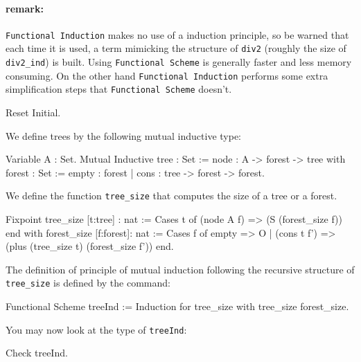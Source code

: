 \begin{coq_example*}
\paragraph{remark:} \texttt{Functional Induction} makes no use of
a induction principle, so be warned that each time it is used, a
term mimicking the structure of \texttt{div2} (roughly the size
of {\tt div2\_ind}) is built. Using \texttt{Functional Scheme} is
generally faster and less memory consuming.  On the other hand
\texttt{Functional Induction} performs some extra simplification
steps that \texttt{Functional Scheme} doesn't.




\begin{coq_eval}
Reset Initial.
\end{coq_eval}

We define trees by the following mutual inductive type:

\begin{coq_example*}
Variable A : Set.
Mutual Inductive 
     tree   : Set := node : A -> forest -> tree
with forest : Set := empty : forest 
                  | cons : tree -> forest -> forest.
\end{coq_example*}

We define the function \texttt{tree\_size} that computes the size
of a tree or a forest.

\begin{coq_example*}                
Fixpoint tree_size  [t:tree] : nat := 
 Cases t of (node A f) => (S (forest_size f)) end
  with  forest_size [f:forest]: nat := 
 Cases f of
  empty => O
 | (cons t f') => (plus (tree_size t) (forest_size f'))
 end.
\end{coq_example*}

The definition of principle of mutual induction following the
recursive structure of \texttt{tree\_size} is defined by the
command:

\begin{coq_example*}
Functional Scheme treeInd := Induction for tree_size with tree_size forest_size.
\end{coq_example*}

You may now look at the type of {\tt treeInd}:

\begin{coq_example}
Check treeInd.
\end{coq_example}




\end{coq_example*}
